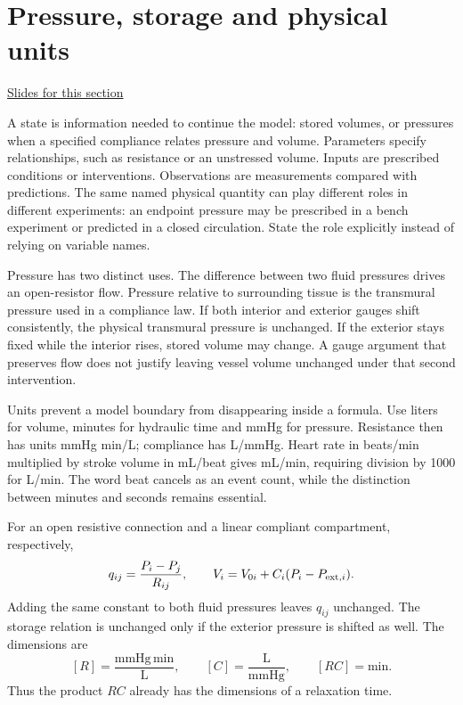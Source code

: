 \documentclass[11pt,letterpaper]{article}
\theoremstyle{definition}\newtheorem{definition}{Definition}\newtheorem{example}{Example}
\numberwithin{equation}{section}
\begin{document}
\section{Pressure, storage and physical units}
\hypertarget{note-pressure-storage-and-physical-units}{}\label{note:pressure-storage-and-physical-units}
{\small \href{slides.html\#frame=flow-and-compliant-storage\&step=1}{Slides for this section}}\par
A state is information needed to continue the model: stored volumes, or pressures when a specified compliance relates pressure and volume. Parameters specify relationships, such as resistance or an unstressed volume. Inputs are prescribed conditions or interventions. Observations are measurements compared with predictions. The same named physical quantity can play different roles in different experiments: an endpoint pressure may be prescribed in a bench experiment or predicted in a closed circulation. State the role explicitly instead of relying on variable names.

Pressure has two distinct uses. The difference between two fluid pressures drives an open-resistor flow. Pressure relative to surrounding tissue is the transmural pressure used in a compliance law. If both interior and exterior gauges shift consistently, the physical transmural pressure is unchanged. If the exterior stays fixed while the interior rises, stored volume may change. A gauge argument that preserves flow does not justify leaving vessel volume unchanged under that second intervention.

Units prevent a model boundary from disappearing inside a formula. Use liters for volume, minutes for hydraulic time and mmHg for pressure. Resistance then has units mmHg min/L; compliance has L/mmHg. Heart rate in beats/min multiplied by stroke volume in mL/beat gives mL/min, requiring division by 1000 for L/min. The word beat cancels as an event count, while the distinction between minutes and seconds remains essential.

For an open resistive connection and a linear compliant compartment, respectively,
\[
 q_{ij}=\frac{P_i-P_j}{R_{ij}},\qquad
 V_i=V_{0i}+C_i(P_i-P_{{\rm ext},i}).
\]
Adding the same constant to both fluid pressures leaves $q_{ij}$ unchanged. The storage relation is unchanged only if the exterior pressure is shifted as well. The dimensions are
\[
 [R]=\frac{\mathrm{mmHg}\,\mathrm{min}}{\mathrm L},\qquad
 [C]=\frac{\mathrm L}{\mathrm{mmHg}},\qquad [RC]=\mathrm{min}.
\]
Thus the product $RC$ already has the dimensions of a relaxation time.
\end{document}
